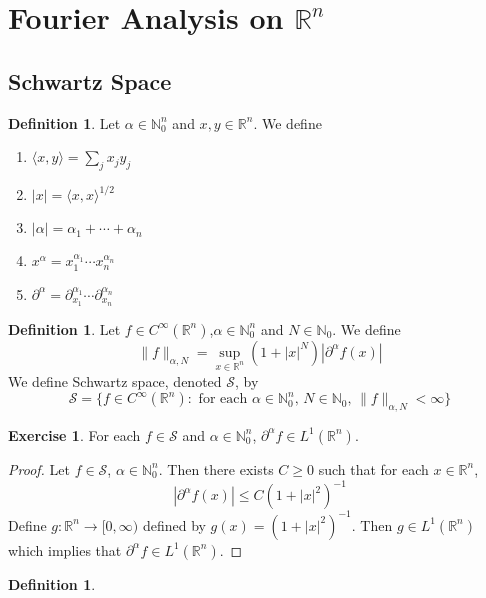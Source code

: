 \documentclass[12pt]{amsart}
\theoremstyle{definition}
\newtheorem{defn}[definition]{Definition}
\newtheorem{ex}[definition]{Exercise}
\newcommand{\p}{\partial}
\newcommand{\al}{\alpha}
\newcommand{\N}{\mathbb{N}}
\newcommand{\R}{\mathbb{R}}
\newcommand{\MS}{\mathcal{S}}
\renewcommand{\r}{\rangle}
\renewcommand{\l}{\langle}
\newcommand{\Rg}{[0,\infty)}
\newcommand{\lex}[1]{\label{ex:#1}}
\newcommand{\ld}[1]{\label{defn:#1}}
\begin{document}
	
	
	
	
	
	
	
	
	\newpage
	\section{Fourier Analysis on $\R^n$}	

	\subsection{Schwartz Space}
	\begin{defn}
	\ld{100} Let $\al \in \N_0^n$ and $x, y \in \R^n$. We define 
	\begin{enumerate}
	\item $\l x , y\r  = \sum_{j}x_jy_j$
	\item $|x| = \l x, x\r^{1/2}$
	\item $|\al| = \al_1 + \cdots + \al_n$
	\item $x^\al = x_1^{\al_1}\cdots x_n^{\al_n}$
	\item $\p^{\al} = \p_{x_1}^{\al_1} \cdots \p_{x_n}^{\al_n}$
	\end{enumerate}
	\end{defn}	
	
	\begin{defn}
	\ld{101} Let $f \in C^{\infty}(\R^n)$,$\al \in \N_0^n$ and $N \in \N_0$. We define $$\|f\|_{\al, N} = \sup_{x \in \R^n} (1+|x|^N) |\p^{\al}f (x) |$$
	We define Schwartz space, denoted $\MS$, by $$\MS = \{f \in C^{\infty}(\R^n): \text{ for each $\al \in \N_0^n$, $N \in \N_0$, } \|f\|_{\al, N} < \infty\}$$
	\end{defn}
	
	\begin{ex}
	\lex{102} For each $f \in \MS$ and $\al \in \N_0^n$, $\p^\al f \in L^1(\R^n)$.
	\end{ex}
	
	\begin{proof}
	Let $f \in \MS$, $\al \in \N_0^n$. Then there exists $C \geq 0$ such that for each $x \in \R^n$, $$| \p^{\al} f(x)| \leq C(1+|x|^{2})^{-1}$$
	Define $g:\R^n \rightarrow \Rg$ defined by $g(x) = (1+|x|^{2})^{-1}$. Then $g \in L^1(\R^n)$ which implies that $\p^{\al} f \in L^1(\R^n)$.
	\end{proof}
	
	\begin{defn}
	
	\end{defn}
	
\end{document}
